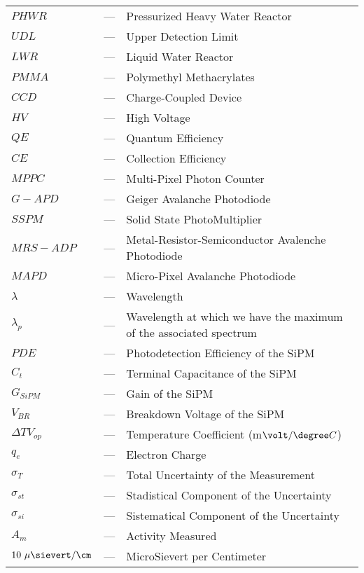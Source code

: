 \begin{longtable}{p{25mm} c p{120mm} }
$PHWR$ & --- & Pressurized Heavy Water Reactor\\
$UDL$ & --- & Upper Detection Limit\\
$LWR$ & --- & Liquid Water Reactor\\

$PMMA$ & --- & Polymethyl Methacrylates\\
$CCD$ & --- & Charge-Coupled Device\\
$HV$ & --- & High Voltage\\
$QE$ & --- & Quantum Efficiency\\
$CE$ & --- & Collection Efficiency\\
$MPPC$ & --- & Multi-Pixel Photon Counter\\
$G-APD$ & --- & Geiger Avalanche Photodiode\\
$SSPM$ & --- & Solid State PhotoMultiplier\\
$MRS-ADP$ & --- & Metal-Resistor-Semiconductor Avalenche Photodiode\\
$MAPD$ & --- & Micro-Pixel Avalanche Photodiode\\
$\lambda$ & --- & Wavelength\\
$\lambda_p$ & --- & Wavelength at which we have the maximum of the
\newline associated spectrum\\
$PDE$ & --- & Photodetection Efficiency of the SiPM\\
$C_t$ & --- & Terminal Capacitance of the SiPM\\
$G_{SiPM}$ & --- & Gain of the SiPM\\
$V_{BR}$ & --- & Breakdown Voltage of the SiPM\\
$\Delta TV_{op}$ & --- & Temperature Coefficient (m$\volt/\degree C$)\\
$q_{e}$ & --- & Electron Charge\\
$\sigma_{T}$ & --- & Total Uncertainty of the Measurement\\
$\sigma_{st}$ & --- & Stadistical Component of the Uncertainty\\
$\sigma_{si}$ & --- & Sistematical Component of the Uncertainty\\
$A_{m}$ & --- & Activity Measured\\
$10~\mu\sievert/\cm$ & --- & MicroSievert per Centimeter\\



\end{longtable}
